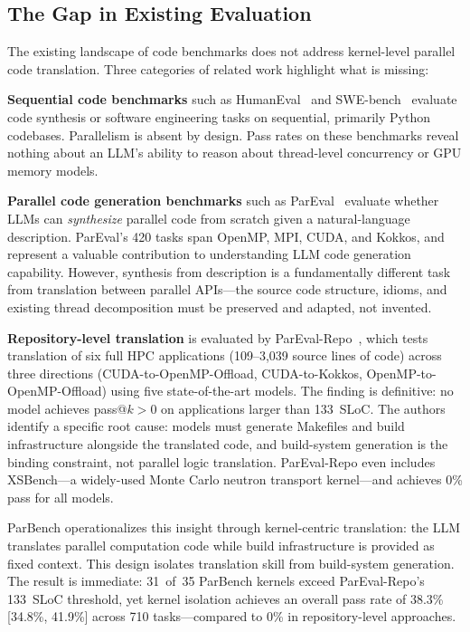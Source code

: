 \documentclass[conference]{IEEEtran}
\begin{document}
\subsection{The Gap in Existing Evaluation}
\label{sec:gap}

The existing landscape of code benchmarks does not address kernel-level parallel code translation. Three categories of related work highlight what is missing:

\textbf{Sequential code benchmarks} such as HumanEval~\cite{HumanEval2021} and SWE-bench~\cite{SWEbench2024} evaluate code synthesis or software engineering tasks on sequential, primarily Python codebases. Parallelism is absent by design. Pass rates on these benchmarks reveal nothing about an LLM's ability to reason about thread-level concurrency or GPU memory models.

\textbf{Parallel code generation benchmarks} such as ParEval~\cite{ParEval2024} evaluate whether LLMs can \emph{synthesize} parallel code from scratch given a natural-language description. ParEval's 420 tasks span OpenMP, MPI, CUDA, and Kokkos, and represent a valuable contribution to understanding LLM code generation capability. However, synthesis from description is a fundamentally different task from translation between parallel APIs---the source code structure, idioms, and existing thread decomposition must be preserved and adapted, not invented.

\textbf{Repository-level translation} is evaluated by ParEval-Repo~\cite{ParEvalRepo2025}, which tests translation of six full HPC applications (109--3,039 source lines of code) across three directions (CUDA-to-OpenMP-Offload, CUDA-to-Kokkos, OpenMP-to-OpenMP-Offload) using five state-of-the-art models. The finding is definitive: no model achieves pass@$k > 0$ on applications larger than 133~SLoC. The authors identify a specific root cause: models must generate Makefiles and build infrastructure alongside the translated code, and build-system generation is the binding constraint, not parallel logic translation. ParEval-Repo even includes XSBench---a widely-used Monte Carlo neutron transport kernel---and achieves 0\% pass for all models.

ParBench operationalizes this insight through kernel-centric translation: the LLM translates parallel computation code while build infrastructure is provided as fixed context. This design isolates translation skill from build-system generation. The result is immediate: 31~of~35 ParBench kernels exceed ParEval-Repo's 133~SLoC threshold, yet kernel isolation achieves an overall pass rate of 38.3\% [34.8\%, 41.9\%] across 710 tasks---compared to 0\% in repository-level approaches.
\end{document}
